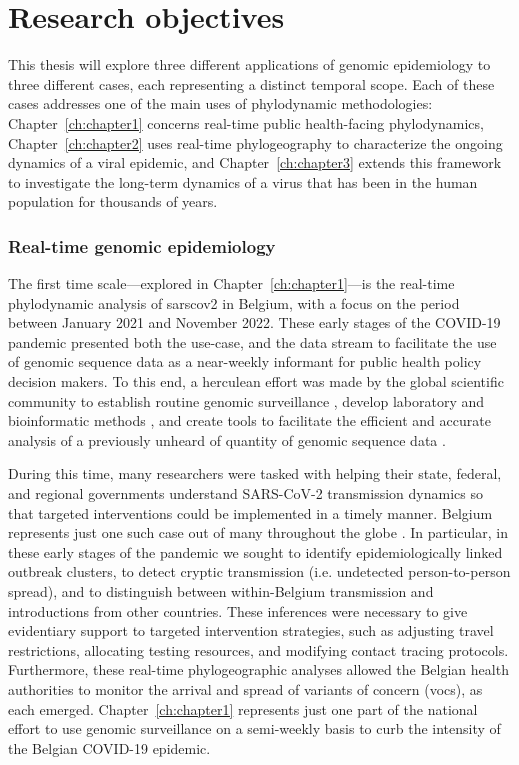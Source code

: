 \section{Research objectives}
This thesis will explore three different applications of genomic epidemiology to three different cases, each representing a distinct temporal scope.
Each of these cases addresses one of the main uses of phylodynamic methodologies: Chapter~\ref{ch:chapter1} concerns real-time public health-facing phylodynamics, Chapter~\ref{ch:chapter2} uses real-time phylogeography to characterize the ongoing dynamics of a viral epidemic, and Chapter~\ref{ch:chapter3} extends this framework to investigate the long-term dynamics of a virus that has been in the human population for thousands of years.

\subsubsection{Real-time genomic epidemiology}
The first time scale---explored in Chapter~\ref{ch:chapter1}---is the real-time phylodynamic analysis of \gls{sarscov2} in Belgium, with a focus on the period between January 2021 and November 2022.
These early stages of the COVID-19 pandemic presented both the use-case, and the data stream \citep{brito2022global} to facilitate the use of genomic sequence data as a near-weekly informant for public health policy decision makers.
To this end, a herculean effort was made by the global scientific community to establish routine genomic surveillance \citep{smith2020integrated,deng2020genomic,tegally2022evolving}, develop laboratory and bioinformatic methods \citep{wang2020establishment,tyson2020improvements,chiara2021next}, and create tools to facilitate the efficient and accurate analysis of a previously unheard of quantity of genomic sequence data \citep{shu2017gisaid,minh2020iq,aksamentov2021nextclade}.

During this time, many researchers were tasked with helping their state, federal, and regional governments understand SARS-CoV-2 transmission dynamics so that targeted interventions could be implemented in a timely manner.
Belgium represents just one such case out of many throughout the globe \citep{giovanetti2022genomic,lu2020genomic,da2021genomic,alteri2021genomic,geoghegan2020genomic}.
In particular, in these early stages of the pandemic we sought to identify epidemiologically linked outbreak clusters, to detect cryptic transmission (i.e. undetected person-to-person spread), and to distinguish between within-Belgium transmission and introductions from other countries.
These inferences were necessary to give evidentiary support to targeted intervention strategies, such as adjusting travel restrictions, allocating testing resources, and modifying contact tracing protocols.
Furthermore, these real-time phylogeographic analyses allowed the Belgian health authorities to monitor the arrival and spread of variants of concern (\gls{voc}s), as each emerged.
Chapter~\ref{ch:chapter1} represents just one part of the national effort to use genomic surveillance on a semi-weekly basis to curb the intensity of the Belgian COVID-19 epidemic.

